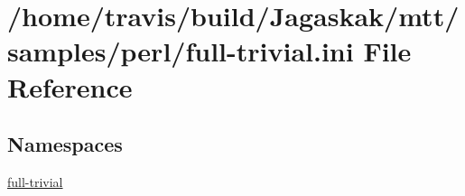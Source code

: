 \hypertarget{full-trivial_8ini}{\section{/home/travis/build/\-Jagaskak/mtt/samples/perl/full-\/trivial.ini File Reference}
\label{full-trivial_8ini}
}
\subsection*{Namespaces}
\begin{DoxyCompactItemize}
\item 
\hyperlink{namespacefull-trivial}{full-\/trivial}
\end{DoxyCompactItemize}
